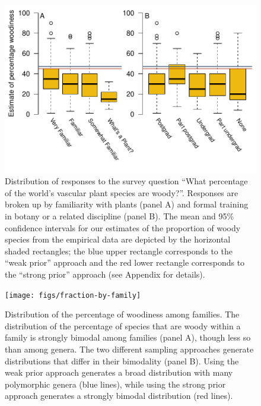 \documentclass[a4paper,12pt]{article}
\begin{document}
\begin{figure}[p]
  \centering
  \includegraphics{figs/survey-results}
  \caption{Distribution of responses to the survey question ``What
    percentage of the world's vascular plant species are
    woody?''. Responses are broken up by familiarity with plants
    (panel A) and formal training in botany or a related discipline
    (panel B). The mean and 95\% confidence intervals for our
    estimates of the proportion of woody species from the empirical
    data are depicted by the horizontal shaded rectangles; the blue
    upper rectangle corresponds to the ``weak prior'' approach and the
    red lower rectangle corresponds to the ``strong prior'' approach
    (see Appendix for details).}
  \label{fig:survey}
\end{figure}

\clearpage
\renewcommand\thefigure{S.\arabic{figure}}
\renewcommand\thetable{S.\arabic{table}}
\setcounter{figure}{0}    
\setcounter{table}{0}

\begin{figure}[p]
  \centering
  \texttt{[image: figs/fraction-by-family]}
  \caption{Distribution of the percentage of woodiness among families.
    The distribution of the percentage of species that are woody within
    a family is strongly bimodal among families (panel A), though less
    so than among genera.
    The two different sampling approaches generate distributions that
    differ in their bimodality (panel B).  Using the weak prior
    approach generates a broad distribution with many polymorphic
    genera (blue lines), while using the strong prior approach
    generates a strongly bimodal distribution (red lines).}
  \label{fig:distribution-family}
\end{figure}
\end{document}
